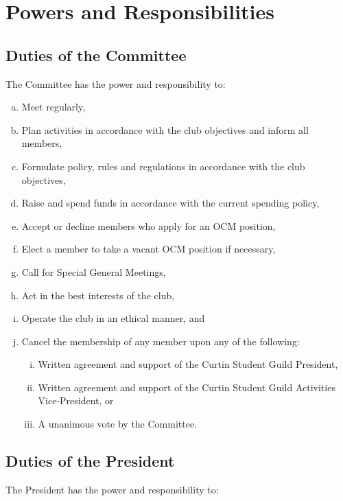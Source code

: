 \documentclass[a4paper,12pt]{article}
\begin{document}
\section{Powers and Responsibilities}

\subsection{Duties of the Committee}

The Committee has the power and responsibility to:

\begin{enumerate}[a)]
	\item Meet regularly,
	\item Plan activities in accordance with the club objectives and inform all members,
	\item Formulate policy, rules and regulations in accordance with the club objectives,
	\item Raise and spend funds in accordance with the current spending policy,
	\item Accept or decline members who apply for an OCM position,
	\item Elect a member to take a vacant OCM position if necessary,
	\item Call for Special General Meetings,
	\item Act in the best interests of the club,
	\item Operate the club in an ethical manner, and
	\item Cancel the membership of any member upon any of the following:
	\begin{enumerate}[i)]
		\item Written agreement and support of the Curtin Student Guild President,
		\item Written agreement and support of the Curtin Student Guild Activities Vice-President, or
		\item A unanimous vote by the Committee.
	\end{enumerate}
\end{enumerate}

\subsection{Duties of the President}

The President has the power and responsibility to:
\end{document}
